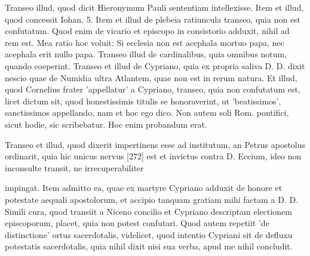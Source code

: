 Transeo illud, quod dicit Hieronymum Pauli sententiam intellexisse. Item et illud, quod concessit Iohan. 5. Item et illud de plebeia ratiuncula transeo, quia non est confutatum. Quod enim de vicario et episcopo in consistorio adduxit, nihil ad rem est. Mea ratio hoc voluit: Si ecclesia non est acephala mortuo papa, nec acephala erit nullo papa. Transeo illud de cardinalibus, quia omnibus notum, quando coeperint. Transeo et illud de Cypriano, quia ex propria saliva D. D. dixit nescio quae de Numidia ultra Atlantem, quae non est in rerum natura. Et illud, quod Cornelius frater 'appellatur' a Cypriano, transeo, quia non confutatum est, licet dictum sit, quod honestissimis titulis se honoraverint, ut 'beatissimos', sanctissimos appellando, nam et hoc ego dico. Non autem soli Rom. pontifici, sicut hodie, sic scribebatur. Hoc enim probandum erat.

Transeo et illud, quod dixerit impertinens esse ad institutum, an Petrus apostolus ordinarit, quia hic unicus nervus [272] est et invictus contra D. Eccium, ideo non inconsulte transit, ne irrecuperabiliter

impingat. Item admitto ea, quae ex martyre Cypriano adduxit de honore et potestate aequali apostolorum, et accipio tanquam gratiam mihi factam a D. D. Simili cura, quod transiit a Niceno concilio et Cypriano descriptam electionem episcoporum, placet, quia non potest confutari. Quod autem repetiit 'de distinctione' ortus sacerdotalis, videlicet, quod intentio Cypriani sit de defluxu potestatis sacerdotalis, quia nihil dixit nisi sua verba, apud me nihil concludit.

